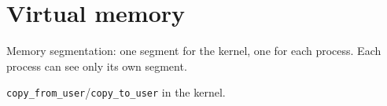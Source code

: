 \section{Virtual memory}

Memory segmentation: one segment for the kernel, one for each process.  Each
process can see only its own segment.

\texttt{copy\_from\_user}/\texttt{copy\_to\_user} in the kernel.
